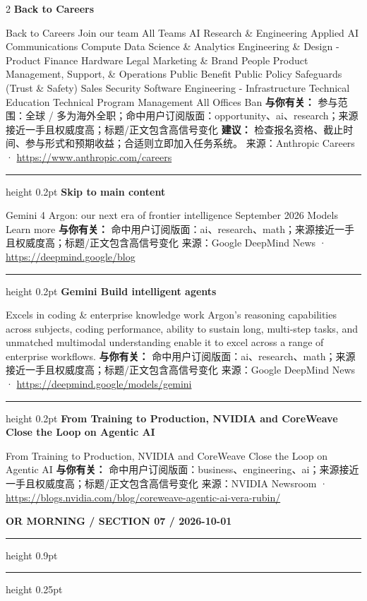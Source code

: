 \documentclass[10.5pt]{ctexart}
\begin{document}
\begin{multicols}{2}
{\large\bfseries Back to Careers}\par
Back to Careers Join our team All Teams AI Research \& Engineering Applied AI Communications Compute Data Science \& Analytics Engineering \& Design - Product Finance Hardware Legal Marketing \& Brand People Product Management, Support, \& Operations Public Benefit Public Policy Safeguards (Trust \& Safety) Sales Security Software Engineering - Infrastructure Technical Education Technical Program Management All Offices Ban
\textbf{与你有关：} 参与范围：全球 / 多为海外全职；命中用户订阅版面：opportunity、ai、research；来源接近一手且权威度高；标题/正文包含高信号变化
\textbf{建议：} 检查报名资格、截止时间、参与形式和预期收益；合适则立即加入任务系统。
{\footnotesize\color{ormuted} 来源：Anthropic Careers · \url{https://www.anthropic.com/careers}}
\vspace{2mm}
\hrule height 0.2pt
\vspace{2mm}
{\large\bfseries Skip to main content}\par
Gemini 4 Argon: our next era of frontier intelligence September 2026 Models Learn more
\textbf{与你有关：} 命中用户订阅版面：ai、research、math；来源接近一手且权威度高；标题/正文包含高信号变化
{\footnotesize\color{ormuted} 来源：Google DeepMind News · \url{https://deepmind.google/blog}}
\vspace{2mm}
\hrule height 0.2pt
\vspace{2mm}
{\large\bfseries Gemini Build intelligent agents}\par
Excels in coding \& enterprise knowledge work Argon’s reasoning capabilities across subjects, coding performance, ability to sustain long, multi-step tasks, and unmatched multimodal understanding enable it to excel across a range of enterprise workflows.
\textbf{与你有关：} 命中用户订阅版面：ai、research、math；来源接近一手且权威度高；标题/正文包含高信号变化
{\footnotesize\color{ormuted} 来源：Google DeepMind News · \url{https://deepmind.google/models/gemini}}
\vspace{2mm}
\hrule height 0.2pt
\vspace{2mm}
{\large\bfseries From Training to Production, NVIDIA and CoreWeave Close the Loop on Agentic AI}\par
From Training to Production, NVIDIA and CoreWeave Close the Loop on Agentic AI
\textbf{与你有关：} 命中用户订阅版面：business、engineering、ai；来源接近一手且权威度高；标题/正文包含高信号变化
{\footnotesize\color{ormuted} 来源：NVIDIA Newsroom · \url{https://blogs.nvidia.com/blog/coreweave-agentic-ai-vera-rubin/}}
\end{multicols}
\newpage
{\small\bfseries OR MORNING / SECTION 07 / 2026-10-01}
\vspace{2mm}
\hrule height 0.9pt
\vspace{1.5mm}
\hrule height 0.25pt
\vspace{4mm}
\end{document}
